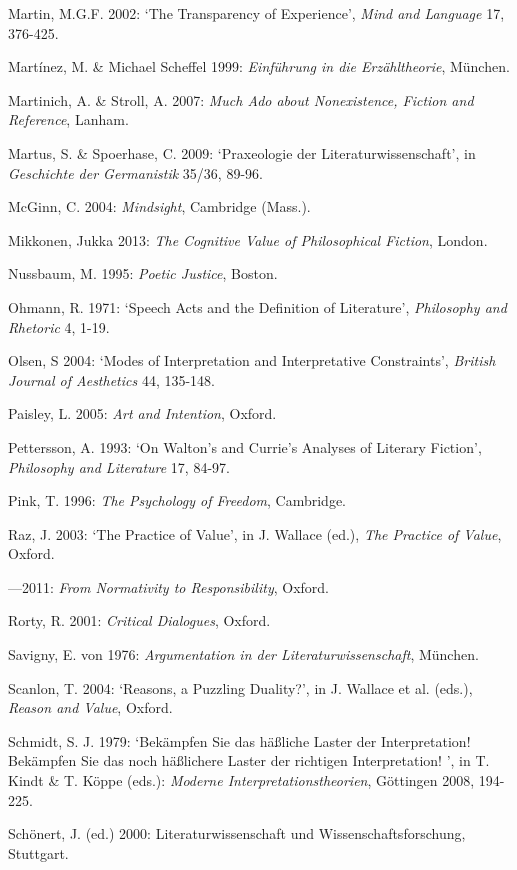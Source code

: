 \begin{hangparas}{.5cm}{1}
Martin, M.G.F. 2002: `The Transparency of Experience', \emph{Mind and Language} 17, 376-425.

Mart\'inez, M. \& Michael Scheffel 1999: \emph{Einf\"uhrung in die Erz\"ahltheorie}, M\"unchen.

Martinich, A. \& Stroll, A. 2007: \emph{Much Ado about Nonexistence, Fiction and Reference}, Lanham.

Martus, S. \& Spoerhase, C. 2009: `Praxeologie der Literaturwissenschaft', in \emph{Geschichte der Germanistik} 35/36, 89-96.

McGinn, C. 2004: \emph{Mindsight}, Cambridge (Mass.).

Mikkonen, Jukka 2013: \emph{The Cognitive Value of Philosophical Fiction}, London.

Nussbaum, M. 1995: \emph{Poetic Justice}, Boston.

Ohmann, R. 1971: `Speech Acts and the Definition of Literature', \emph{Philosophy and Rhetoric} 4, 1-19.

Olsen, S 2004: `Modes of Interpretation and Interpretative Constraints', \emph{British Journal of Aesthetics} 44, 135-148.

Paisley, L. 2005: \emph{Art and Intention}, Oxford.

Pettersson, A. 1993: `On Walton's and Currie's Analyses of Literary Fiction', \emph{Philosophy and Literature} 17, 84-97.

Pink, T. 1996: \emph{The Psychology of Freedom}, Cambridge.

Raz, J. 2003: `The Practice of Value', in J. Wallace (ed.), \emph{The Practice of Value}, Oxford.

---2011: \emph{From Normativity to Responsibility}, Oxford. 

Rorty, R. 2001: \emph{Critical Dialogues}, Oxford.

Savigny, E. von 1976: \emph{Argumentation in der Literaturwissenschaft}, M\"unchen.

Scanlon, T. 2004: `Reasons, a Puzzling Duality?', in J. Wallace et al. (eds.), \emph{Reason and Value}, Oxford.

Schmidt, S. J. 1979: `Bek\"ampfen Sie das h\"a{\ss}liche Laster der Interpretation! Bek\"ampfen Sie das noch h\"a{\ss}lichere Laster der richtigen Interpretation! ', in T. Kindt \& T. K\"oppe (eds.): \emph{Moderne Interpretationstheorien}, G\"ottingen 2008, 194-225.

Sch\"onert, J. (ed.) 2000: Literaturwissenschaft und Wissenschaftsforschung, Stuttgart.


\end{hangparas}
